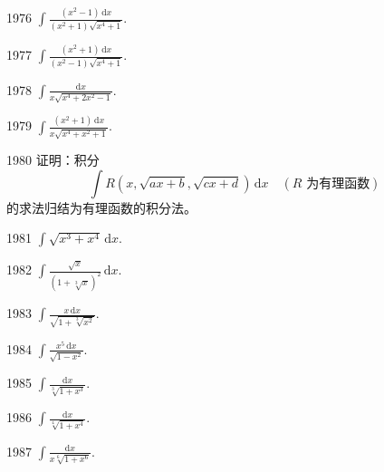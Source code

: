 \begin{prob}[S]{1976}
$\displaystyle \int \frac{(x^2 - 1)\,\mathrm{d}x}{(x^2 + 1)\sqrt{x^4 + 1}}$.
\end{prob}

\begin{prob}[S]{1977}
$\displaystyle \int \frac{(x^2 + 1)\,\mathrm{d}x}{(x^2 - 1)\sqrt{x^4 + 1}}$.
\end{prob}

\begin{prob}[S]{1978}
$\displaystyle \int \frac{\mathrm{d}x}{x\sqrt{x^4 + 2x^2 - 1}}$.
\end{prob}

\begin{prob}[S]{1979}
$\displaystyle \int \frac{(x^2 + 1)\,\mathrm{d}x}{x\sqrt{x^4 + x^2 + 1}}$.
\end{prob}

\begin{prob}[M]{1980}
证明：积分
\[
\int R(x, \sqrt{ax + b}, \sqrt{cx + d})\,\mathrm{d}x \quad (R \text{ 为有理函数})
\]
的求法归结为有理函数的积分法。
\end{prob}


\begin{prob}[S]{1981}
$\displaystyle \int \sqrt{x^3 + x^4}\,\mathrm{d}x$.
\end{prob}

\begin{prob}[S]{1982}
$\displaystyle \int \frac{\sqrt{x}}{(1 + \sqrt[3]{x})^2}\,\mathrm{d}x$.
\end{prob}

\begin{prob}[S]{1983}
$\displaystyle \int \frac{x\,\mathrm{d}x}{\sqrt{1 + \sqrt[3]{x^2}}}$.
\end{prob}

\begin{prob}[S]{1984}
$\displaystyle \int \frac{x^5\,\mathrm{d}x}{\sqrt{1 - x^2}}$.
\end{prob}

\begin{prob}[S]{1985}
$\displaystyle \int \frac{\mathrm{d}x}{\sqrt[3]{1 + x^3}}$.
\end{prob}

\begin{prob}[S]{1986}
$\displaystyle \int \frac{\mathrm{d}x}{\sqrt[4]{1 + x^4}}$.
\end{prob}

\begin{prob}[S]{1987}
$\displaystyle \int \frac{\mathrm{d}x}{x\sqrt[6]{1 + x^6}}$.
\end{prob}

